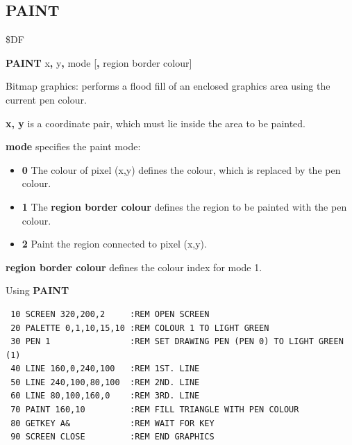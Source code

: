 
\newpage
\subsection{PAINT}
\begin{description}[leftmargin=2cm,style=nextline]
\item [Token:] \$DF
\item [Format:] {\bf PAINT} x{\bf,} y{\bf,} mode [{\bf,} region border colour]
\item [Usage:]  Bitmap graphics: performs a flood fill of an enclosed graphics
                area using the current pen colour.

                {\bf x, y} is a coordinate pair, which must
                lie inside the area to be painted.

                {\bf mode} specifies the paint mode:
                \begin{itemize}
                    \item {\bf 0} The colour of pixel (x,y) defines the colour,
                    which is replaced by the pen colour.

                    \item {\bf 1} The {\bf region border colour} defines
                    the region to be painted with the pen colour.

                    \item {\bf 2} Paint the region connected to pixel (x,y).
                \end{itemize}

                {\bf region border colour} defines the colour index for mode 1.

\item [Example:] Using {\bf PAINT}

\begin{tcolorbox}[colback=black,coltext=white]
\verbatimfont{\codefont}
\begin{verbatim}
 10 SCREEN 320,200,2     :REM OPEN SCREEN
 20 PALETTE 0,1,10,15,10 :REM COLOUR 1 TO LIGHT GREEN
 30 PEN 1                :REM SET DRAWING PEN (PEN 0) TO LIGHT GREEN (1)
 40 LINE 160,0,240,100   :REM 1ST. LINE
 50 LINE 240,100,80,100  :REM 2ND. LINE
 60 LINE 80,100,160,0    :REM 3RD. LINE
 70 PAINT 160,10         :REM FILL TRIANGLE WITH PEN COLOUR
 80 GETKEY A&            :REM WAIT FOR KEY
 90 SCREEN CLOSE         :REM END GRAPHICS
\end{verbatim}
\end{tcolorbox}
\end{description}

